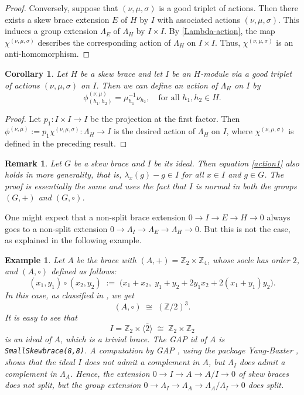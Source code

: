 \documentclass[11pt]{amsart}
\theoremstyle{thrm}
\theoremstyle{plain}
\newtheorem{cor}[thm]{Corollary}
\newtheorem{example}[thm]{Example}
\newtheorem{remark}[thm]{Remark}
\theoremstyle{definition}
\numberwithin{equation}{section}
\begin{document}
\begin{proof}
Conversely, suppose that $(\nu, \mu, \sigma)$ is a good triplet of actions. Then there exists a skew brace extension $E$ of $H$ by $I$ with associated actions $(\nu, \mu, \sigma)$. This induces a group extension $\Lambda_E$ of $\Lambda_H$ by $I \times I$. By \eqref{Lambda-action}, the map $\chi^{(\nu, \mu, \sigma)}$ describes the corresponding action of $\Lambda_H$ on $I \times I$. Thus, $\chi^{(\nu, \mu, \sigma)}$ is an anti-homomorphism.
\end{proof}


\begin{cor}\label{inducedaction}
	Let $H$ be a skew brace and let $I$ be an $H$-module via a good triplet of actions $(\nu, \mu, \sigma)$ on $I$. Then we can define an action of $\Lambda_H$ on $I$ by
	\[
	\phi^{(\nu, \mu)}_{(h_1, h_2)} = \mu^{-1}_{h_1} \nu_{h_2}, \quad \text{for all } h_1, h_2 \in H.
	\]
\end{cor}
\begin{proof}
Let $p_1: I \times I \to I$ be the projection at the first factor. Then $\phi^{(\nu, \mu)} :=  p_1 \chi^{(\nu, \mu, \sigma)} : \Lambda_H  \to I$ is the desired action of  $\Lambda_H$ on $I$, where $\chi^{(\nu, \mu, \sigma)}$ is defined in the preceding result. \end{proof}

\begin{remark}\label{remark-ideal}
Let $G$ be a skew brace and $I$ be its ideal. Then equation \eqref{action1} also holds in more generality, that is, $\lambda_x(g)-g \in I$ for all $x \in I$ and $g \in G$. The proof is essentially the same and uses the fact that $I$ is normal in both the groups $(G, +)$ and $(G, \circ)$.
\end{remark}


One might expect that a non-split brace extension $0 \to I \to E \to H \to 0$ always goes to a non-split extension $0 \to \Lambda_I \to \Lambda_E \to \Lambda_H \to  0$. But this is not the case, as explained in the following example.  
\begin{example}\label{exp0}
Let $A$ be the brace with $(A, +) = \mathbb{Z}_2 \times \mathbb{Z}_4$, whose socle has order $2$, and $(A, \circ)$ defined as follows:
\[
(x_1, y_1) \circ (x_2, y_2)
\;:=\;
\bigl(x_1 + x_2,\; y_1 + y_2 + 2y_1x_2 + 2(x_1 + y_1)y_2 \bigr).
\]
In this case, as classified in \cite{Bach15}, we get
\[
(A, \circ) \;\cong\; (\mathbb{Z}/2)^3.
\]
It is easy to see that 
\[
I = \mathbb{Z}_2 \times \langle \bar{2} \rangle \;\cong\; \mathbb{Z}_2 \times \mathbb{Z}_2
\]
is an ideal of $A$, which is a trivial brace. The GAP id of $A$ is \texttt{SmallSkewbrace(8,8)}. A computation by GAP \cite{GAP}, using the package Yang-Baxter \cite{VK24}, shows that the ideal $I$ does not admit a complement in $A$, but $\Lambda_I$ does admit a complement in $\Lambda_A$. Hence, the extension $0 \to I \to A \to A/I \to 0$ of  skew braces does not split, but the group extension $0 \to \Lambda_I \to \Lambda_A \to \Lambda_A/\Lambda_I \to 0$  does split.
\end{example}
 
\end{document}

